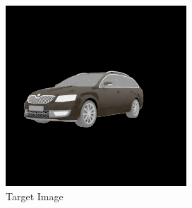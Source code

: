\begin{figure}
    \centering
    \caption{Varying the environment map distribution affects the quality of the outputs of our
        model. If we train a network with non-matching environment maps sampled from
        the training distribution, we learn a reasonable texture as shown in
        Figure~\ref{fig:pose-vary-sim}. Unfortunately, using environment maps sampled from a
        different distribution leads to \emph{mode collapse}.}
    \label{fig:pose-vary-1}
    \vspace{0.2in}
    \begin{subfigure}[t]{0.24\linewidth}
        \centering
        \includegraphics[width=\linewidth]{graphics/envmap_target.png}
        \caption{Target Image}
    \end{subfigure}
    \begin{subfigure}[t]{0.24\linewidth}
        \centering

\end{subfigure}
\end{figure}
